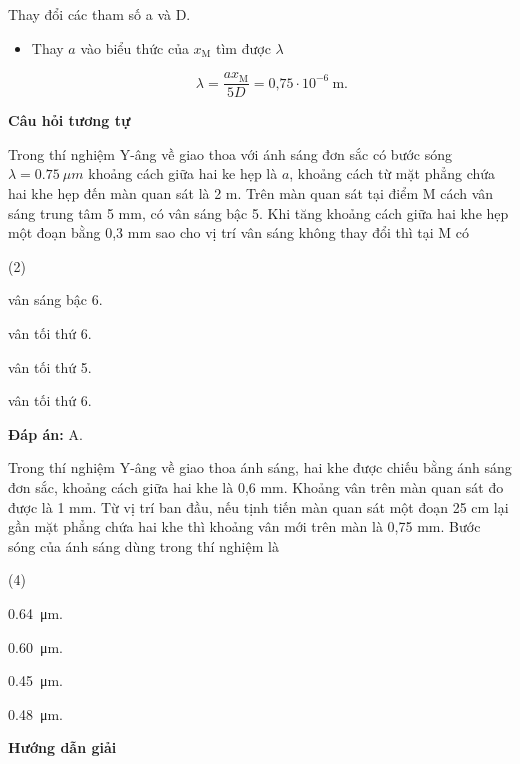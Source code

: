 \begin{dang}{Thay đổi các tham số a và D.}
{\begin{itemize}
	\begin{equation*}
		\dfrac{5}{a}=  \dfrac{6}{a+ \text{0,3}}\Rightarrow a = \text{0,5}\ \text{mm}.
	\end{equation*}

	\item Thay $a$ vào biểu thức của $x_{\text{M}}$ tìm được $\lambda$
	
	\begin{equation*}
		\lambda = \dfrac{a x_{\text{M}}}{5D}= \text{0,75} \cdot 10^{-6}\ \text{m}.
	\end{equation*}
\end{itemize}

\begin{center}
	\textbf{Câu hỏi tương tự}
\end{center}

Trong  thí nghiệm Y-âng về giao thoa với ánh sáng đơn sắc có bước sóng $\lambda = \SI{0,75}{\mu m}$  khoảng cách giữa hai ke hẹp là $a$, khoảng cách từ mặt phẳng chứa hai khe hẹp đến màn quan sát là 2 m. Trên màn quan sát tại điểm M cách vân sáng trung tâm 5 mm, có vân sáng bậc 5. Khi tăng khoảng cách giữa hai khe hẹp một đoạn bằng 0,3 mm sao cho vị trí vân sáng không thay đổi thì tại M có 
\begin{mcq}(2)
\item vân sáng bậc 6.		
\item vân tối thứ 6.		
\item vân tối thứ 5.		
\item vân tối thứ 6.	
\end{mcq}

\textbf{Đáp án:} A.
}
{Trong thí nghiệm Y-âng về giao thoa ánh sáng, hai khe được chiếu bằng ánh sáng đơn sắc, khoảng cách giữa hai khe là 0,6 mm. Khoảng vân trên màn quan sát đo được là 1 mm. Từ vị trí ban đầu, nếu tịnh tiến màn quan sát một đoạn 25 cm lại gần mặt phẳng chứa hai khe thì khoảng vân mới trên màn là 0,75 mm. Bước sóng của ánh sáng dùng trong thí nghiệm là 
\begin{mcq}(4)
\item  \SI{0,64}{\micro\meter}.		
\item  \SI{0,60}{\micro\meter}.		
\item  \SI{0,45}{\micro\meter}.		
\item  \SI{0,48}{\micro\meter}.
\end{mcq}
}
{\begin{center}
	\textbf{Hướng dẫn giải}
\end{center}

}
\end{dang}
